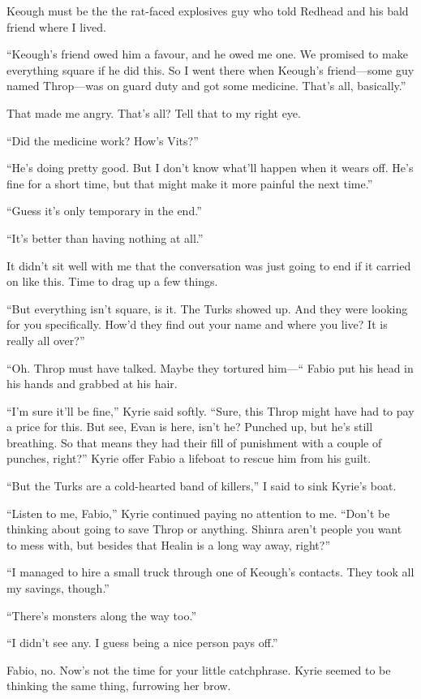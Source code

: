 \documentclass[oneside]{book}
\begin{document}
Keough must be the the rat-faced explosives guy who told Redhead and his bald friend where I lived.

“Keough’s friend owed him a favour, and he owed me one. We promised to make everything square if he did this. So I went there when Keough’s friend—some guy named Throp—was on guard duty and got some medicine. That’s all, basically.”

That made me angry. That’s all? Tell that to my right eye.

“Did the medicine work? How’s Vits?”

“He’s doing pretty good. But I don’t know what’ll happen when it wears off. He’s fine for a short time, but that might make it more painful the next time.”

“Guess it’s only temporary in the end.”

“It’s better than having nothing at all.”

It didn’t sit well with me that the conversation was just going to end if it carried on like this. Time to drag up a few things.

“But everything isn’t square, is it. The Turks showed up. And they were looking for you specifically. How’d they find out your name and where you live? It is really all over?”

“Oh. Throp must have talked. Maybe they tortured him—“ Fabio put his head in his hands and grabbed at his hair.

“I’m sure it’ll be fine,” Kyrie said softly. “Sure, this Throp might have had to pay a price for this. But see, Evan is here, isn’t he? Punched up, but he’s still breathing. So that means they had their fill of punishment with a couple of punches, right?” Kyrie offer Fabio a lifeboat to rescue him from his guilt.

“But the Turks are a cold-hearted band of killers,” I said to sink Kyrie’s boat.

“Listen to me, Fabio,” Kyrie continued paying no attention to me. “Don’t be thinking about going to save Throp or anything. Shinra aren’t people you want to mess with, but besides that Healin is a long way away, right?”

“I managed to hire a small truck through one of Keough’s contacts. They took all my savings, though.”

“There’s monsters along the way too.”

“I didn’t see any. I guess being a nice person pays off.”

Fabio, no. Now’s not the time for your little catchphrase. Kyrie seemed to be thinking the same thing, furrowing her brow.
\end{document}
